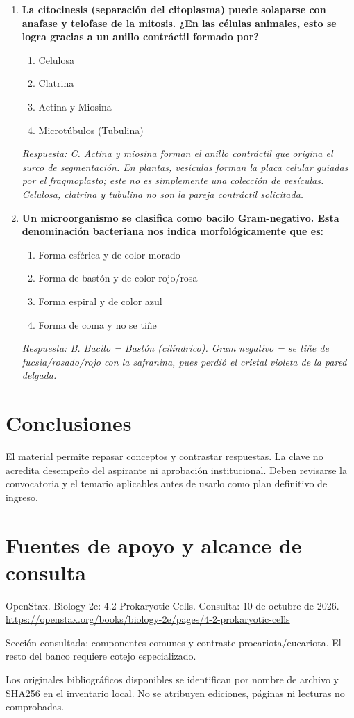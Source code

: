 \begin{enumerate}[label=\textbf{\arabic*.}]
    \item \textbf{La citocinesis (separación del citoplasma) puede solaparse con anafase y telofase de la mitosis. ¿En las células animales, esto se logra gracias a un anillo contráctil formado por?}
    \begin{enumerate}
        \item[A)] Celulosa
        \item[B)] Clatrina
        \item[C)] Actina y Miosina
        \item[D)] Microtúbulos (Tubulina)
    \end{enumerate}
    \textit{Respuesta: C. Actina y miosina forman el anillo contráctil que origina el surco de segmentación. En plantas, vesículas forman la placa celular guiadas por el fragmoplasto; este no es simplemente una colección de vesículas. Celulosa, clatrina y tubulina no son la pareja contráctil solicitada.}

    \item \textbf{Un microorganismo se clasifica como bacilo Gram-negativo. Esta denominación bacteriana nos indica morfológicamente que es:}
    \begin{enumerate}
        \item[A)] Forma esférica y de color morado
        \item[B)] Forma de bastón y de color rojo/rosa
        \item[C)] Forma espiral y de color azul
        \item[D)] Forma de coma y no se tiñe
    \end{enumerate}
    \textit{Respuesta: B. Bacilo = Bastón (cilíndrico). Gram negativo = se tiñe de fucsia/rosado/rojo con la safranina, pues perdió el cristal violeta de la pared delgada.}

\end{enumerate}

\section{Conclusiones}
El material permite repasar conceptos y contrastar respuestas. La clave no acredita desempeño del aspirante ni aprobación institucional. Deben revisarse la convocatoria y el temario aplicables antes de usarlo como plan definitivo de ingreso.
\clearpage\section{Fuentes de apoyo y alcance de consulta}
OpenStax. Biology 2e: 4.2 Prokaryotic Cells. Consulta: 10 de octubre de 2026. \url{https://openstax.org/books/biology-2e/pages/4-2-prokaryotic-cells}\par Sección consultada: componentes comunes y contraste procariota/eucariota. El resto del banco requiere cotejo especializado.\par\medskip
Los originales bibliográficos disponibles se identifican por nombre de archivo y SHA256 en el inventario local. No se atribuyen ediciones, páginas ni lecturas no comprobadas.

